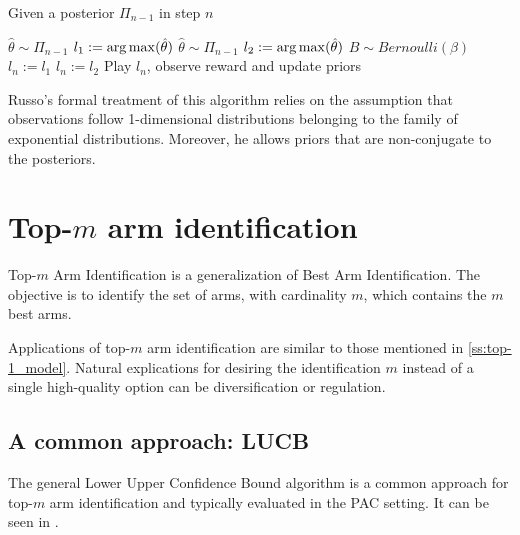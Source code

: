 \begin{algorithm}[H]
    \caption{Given a posterior $\Pi_{n-1}$ in step $n$}
    \label{alg:TTTS}
  \begin{algorithmic}
    \State $\hat{\theta} \sim \Pi_{n-1}$
    \State $l_1 := \operatorname*{arg\,max}(\hat{\theta})$
    \Repeat
      \State $\hat{\theta} \sim \Pi_{n-1}$
      \State $l_2 := \operatorname*{arg\,max}(\hat{\theta})$
    \State $B \sim Bernoulli(\beta)$
      \State $l_n := l_1$
    \Else
      \State $l_n := l_2$
    \EndIf
    \State Play $l_n$, observe reward and update priors
  \end{algorithmic}
\end{algorithm}

Russo's formal treatment of this algorithm relies on the assumption that
observations follow 1-dimensional distributions belonging to the family of
exponential distributions. Moreover, he allows priors that are non-conjugate to
the posteriors.

\section{Top-$m$ arm identification}

Top-$m$ Arm Identification is a generalization of Best Arm Identification. The
objective is to identify the set of arms, with cardinality $m$, which contains
the $m$ best arms.

Applications of top-$m$ arm identification are similar to those mentioned in
\ref{ss:top-1_model}. Natural explications for desiring the identification $m$
instead of a single high-quality option can be diversification or regulation.

\subsection{A common approach: LUCB}
The general Lower Upper Confidence Bound algorithm is a common approach for
top-$m$ arm identification and typically evaluated in the PAC setting. It can be
seen in .

